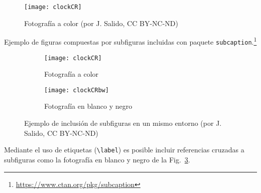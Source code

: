 \begin{figure}[hbt]
	\centering
	\texttt{[image: clockCR]}
	\caption[Ejemplo de figura]{Fotografía a color 
	(por J. Salido, CC BY-NC-ND)}
	\label{fig:ejFigure}
\end{figure}


\noindent Ejemplo de figuras compuestas por subfiguras incluidas con paquete \texttt{subcaption}.\footnote{\url{https://www.ctan.org/pkg/subcaption}}


\begin{figure}[hbt]
	\centering
	\begin{subfigure}[b]{0.4\linewidth}
		\centering
		\texttt{[image: clockCR]}
		\caption{Fotografía a color}\label{fig:fotocolor}
	\end{subfigure} 
	\begin{subfigure}[b]{0.4\linewidth}
		\centering
		\texttt{[image: clockCRbw]}
		\caption{Fotografía en blanco y negro}\label{fig:fotoBW}
	\end{subfigure} 
	\caption[Ejemplo de subfiguras]{Ejemplo de inclusión de subfiguras en un mismo entorno (por J. Salido, CC BY-NC-ND)}
	\label{fig:ejSubfigures}
\end{figure}



Mediante el uso de etiquetas (\texttt{\textbackslash label}) es posible incluir referencias cruzadas a subfiguras como la fotografía en blanco y negro de la Fig.~\ref{fig:fotoBW}.

